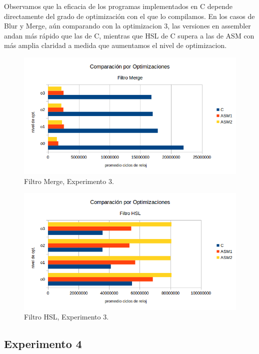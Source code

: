 Observamos que la eficacia de los programas implementados en C depende directamente del grado de optimización con el que lo compilamos. En los casos de Blur y Merge, aún comparando con la optimizacion 3, las versiones en assembler andan más rápido que las de C, mientras que HSL de C supera  a las de ASM con más amplia claridad a medida que aumentamos el nivel de optimizacion.

\begin{figure}[ht!]
\centering
\includegraphics[width=125mm]{imagenes/resultados/grafico-opt-merge.png}
\caption{Filtro Merge, Experimento 3.}
\end{figure}

\begin{figure}[ht!]
\centering
\includegraphics[width=125mm]{imagenes/resultados/grafico-opt-hsl.png}
\caption{Filtro HSL, Experimento 3.}
\end{figure}

\pagebreak
\pagebreak
\newpage

\subsection{Experimento 4}


